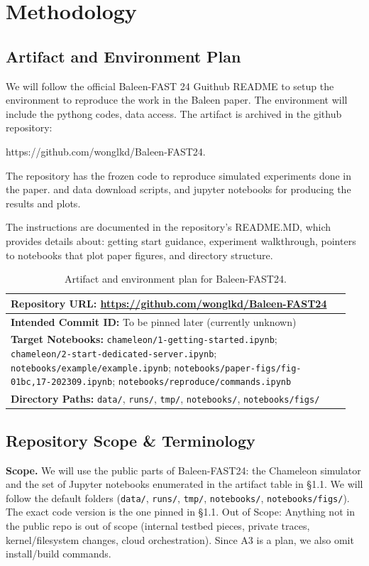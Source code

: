\section{Methodology}


\subsection{Artifact and Environment Plan}
We will follow the official Baleen-FAST 24 Guithub README to setup the environment to reproduce the work in the Baleen paper. The environment will include the pythong codes, data access. The artifact is archived in the github repository:

https://github.com/wonglkd/Baleen-FAST24.

The repository has the frozen code to reproduce simulated experiments done in the paper. and data download scripts, and jupyter notebooks for producing the results and plots. 

The instructions are documented in the repository's README.MD, which provides details about: getting start guidance, experiment walkthrough, pointers to notebooks that plot paper figures, and directory structure.  

\begin{table}[h]
\centering
\begin{tabular}{|p{0.95\linewidth}|}
\hline
\textbf{Repository URL:} \url{https://github.com/wonglkd/Baleen-FAST24} \\
\hline
\textbf{Intended Commit ID:} To be pinned later (currently unknown) \\
\hline
\textbf{Target Notebooks:}
\texttt{chameleon/1-getting-started.ipynb};
\texttt{chameleon/2-start-dedicated-server.ipynb};
\texttt{notebooks/example/example.ipynb};
\texttt{notebooks/paper-figs/fig-01bc,17-202309.ipynb};
\texttt{notebooks/reproduce/commands.ipynb} \\
\hline
\textbf{Directory Paths:} \texttt{data/}, \texttt{runs/}, \texttt{tmp/}, \texttt{notebooks/}, \texttt{notebooks/figs/} \\
\hline
\end{tabular}
\caption{Artifact and environment plan for Baleen-FAST24.}
\end{table}



\subsection{Repository Scope \& Terminology}
\textbf{Scope.}
We will use the public parts of Baleen-FAST24: the Chameleon simulator and the set of Jupyter notebooks enumerated in the artifact table in \S1.1. We will follow the default folders (\texttt{data/}, \texttt{runs/}, \texttt{tmp/}, \texttt{notebooks/}, \texttt{notebooks/figs/}). The exact code version is the one pinned in \S1.1. Out of Scope: Anything not in the public repo is out of scope (internal testbed pieces, private traces, kernel/filesystem changes, cloud orchestration). Since A3 is a plan, we also omit install/build commands.

